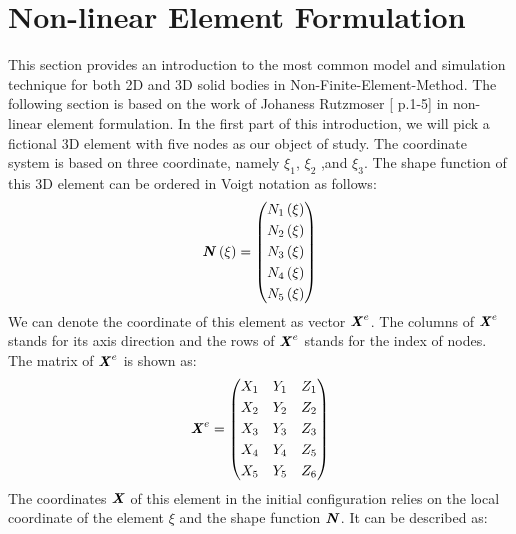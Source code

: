 \section{Non-linear Element Formulation}
This section provides an introduction to the most common model and simulation technique for both 2D and 3D solid bodies in Non-Finite-Element-Method. The following section is based on the work of Johaness Rutzmoser [\cite{Johannes} p.1-5] in non-linear element formulation. In the first part of this introduction, we will pick a fictional 3D element with five nodes as our object of study. The coordinate system is based on three coordinate, namely $\xi_1$, $\xi_2$ ,and $\xi_3$. The shape function of this 3D element can be ordered in Voigt notation as follows:
\begin{equation}
 \textbf{\textit{N}}\left(\xi\right) = \begin{pmatrix}
 N_1\left(\xi\right)           \\[0.3em]
 N_2\left(\xi\right)            \\[0.3em]
 N_3\left(\xi\right)           \\[0.3em]
 N_4\left(\xi\right)         \\[0.3em]
 N_5\left(\xi\right)                            
\end{pmatrix}
\end{equation}
We can denote the coordinate of this element as vector $\textbf{\textit{X}}^e$. The columns of $\textbf{\textit{X}}^e$ stands for its axis direction and the rows of $\textbf{\textit{X}}^e$ stands for the index of nodes. The matrix of $\textbf{\textit{X}}^e$ is shown as:
\begin{equation}
\textbf{\textit{X}}^e = \begin{pmatrix}
X_1 & Y_1 & Z_1           \\[0.3em]
X_2 & Y_2 & Z_2             \\[0.3em]
X_3 & Y_3 & Z_3           \\[0.3em]
X_4 & Y_4 & Z_5          \\[0.3em]
X_5 & Y_5 & Z_6                            
\end{pmatrix}
\end{equation}	
The coordinates $\textbf{\textit{X}}$ of this element in the initial configuration relies on the local coordinate of the element $\xi$ and the shape function $\textbf{\textit{N}}$. It can be described as:
